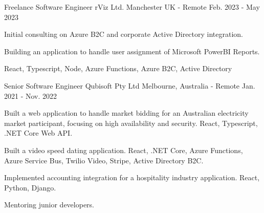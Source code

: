 

\begin{cventries}

\cventry
{Freelance Software Engineer} %
{rViz Ltd.} %
{Manchester UK - Remote} %
{Feb. 2023 - May 2023} %
{
  \begin{cvitems} %
    \item {Initial consulting on Azure B2C and corporate Active Directory integration.}
    \item {Building an application to handle user assignment of Microsoft PowerBI Reports.}
    \item {React, Typescript, Node, Azure Functions, Azure B2C, Active Directory}
  \end{cvitems}
}

\cventry
{Senior Software Engineer} %
{Qubisoft Pty Ltd} %
{Melbourne, Australia - Remote} %
{Jan. 2021 - Nov. 2022} %
{
  \begin{cvitems} %
    \item {Built a web application to handle market bidding for an Australian electricity market participant, focusing on high availability and security.  React, Typescript, .NET Core Web API.}
    \item {Built a video speed dating application.  React, .NET Core, Azure Functions, Azure Service Bus, Twilio Video, Stripe, Active Directory B2C.}
    \item {Implemented accounting integration for a hospitality industry application.  React, Python, Django.}
    \item {Mentoring junior developers.}
  \end{cvitems}
}


\end{cventries}
